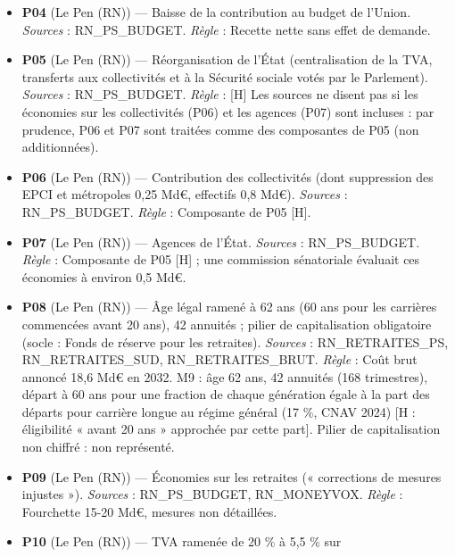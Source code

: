 \documentclass[
  11pt,
  11pt,
  a4paper,
  openany]{book}
\begin{document}
\begin{itemize}
  \textbf{P03} (Le Pen (RN)) --- Économies sur le « coût de
  l'immigration ». \emph{Sources} : RN\_PS\_BUDGET. \emph{Règle} :
  {[}H{]} Composition non publiée : baisse de prestations (transferts).
  La part fondée sur la nationalité est incompatible pour les
  ressortissants de l'Union (M26, niveau 4) ; cette part n'est pas
  connue.
\item
  \textbf{P04} (Le Pen (RN)) --- Baisse de la contribution au budget de
  l'Union. \emph{Sources} : RN\_PS\_BUDGET. \emph{Règle} : Recette nette
  sans effet de demande.
\item
  \textbf{P05} (Le Pen (RN)) --- Réorganisation de l'État
  (centralisation de la TVA, transferts aux collectivités et à la
  Sécurité sociale votés par le Parlement). \emph{Sources} :
  RN\_PS\_BUDGET. \emph{Règle} : {[}H{]} Les sources ne disent pas si
  les économies sur les collectivités (P06) et les agences (P07) sont
  incluses : par prudence, P06 et P07 sont traitées comme des
  composantes de P05 (non additionnées).
\item
  \textbf{P06} (Le Pen (RN)) --- Contribution des collectivités (dont
  suppression des EPCI et métropoles 0,25 Md€, effectifs 0,8 Md€).
  \emph{Sources} : RN\_PS\_BUDGET. \emph{Règle} : Composante de P05
  {[}H{]}.
\item
  \textbf{P07} (Le Pen (RN)) --- Agences de l'État. \emph{Sources} :
  RN\_PS\_BUDGET. \emph{Règle} : Composante de P05 {[}H{]} ; une
  commission sénatoriale évaluait ces économies à environ 0,5 Md€.
\item
  \textbf{P08} (Le Pen (RN)) --- Âge légal ramené à 62 ans (60 ans pour
  les carrières commencées avant 20 ans), 42 annuités ; pilier de
  capitalisation obligatoire (socle : Fonds de réserve pour les
  retraites). \emph{Sources} : RN\_RETRAITES\_PS, RN\_RETRAITES\_SUD,
  RN\_RETRAITES\_BRUT. \emph{Règle} : Coût brut annoncé 18,6 Md€ en
  2032. M9 : âge 62 ans, 42 annuités (168 trimestres), départ à 60 ans
  pour une fraction de chaque génération égale à la part des départs
  pour carrière longue au régime général (17 \%, CNAV 2024) {[}H :
  éligibilité « avant 20 ans » approchée par cette part{]}. Pilier de
  capitalisation non chiffré : non représenté.
\item
  \textbf{P09} (Le Pen (RN)) --- Économies sur les retraites («
  corrections de mesures injustes »). \emph{Sources} : RN\_PS\_BUDGET,
  RN\_MONEYVOX. \emph{Règle} : Fourchette 15-20 Md€, mesures non
  détaillées.
\item
  \textbf{P10} (Le Pen (RN)) --- TVA ramenée de 20 \% à 5,5 \% sur

\end{itemize}
\end{document}
